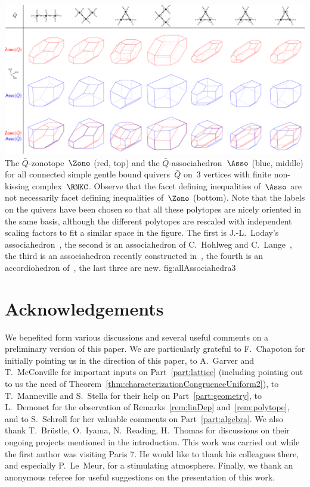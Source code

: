 \documentclass{amsart}
\theoremstyle{definition}
\begin{document}
\captionsetup{width=1.5\textwidth}
{\includegraphics[scale=.27]{allAssociahedra3}}
{The $\bar Q$-zonotope~$\Zono$ (red, top) and the $\bar Q$-associahedron~$\Asso$ (blue, middle) for all connected simple gentle bound quivers~$\bar Q$ on~$3$ vertices with finite non-kissing complex~$\RNKC$. Observe that the facet defining inequalities of~$\Asso$ are not necessarily facet defining inequalities of~$\Zono$ (bottom). Note that the labels on the quivers have been chosen so that all these polytopes are nicely oriented in the same basis, although the different polytopes are rescaled with independent scaling factors to fit a similar space in the figure. The first is J.-L.~Loday's associahedron~\cite{Loday}, the second is an associahedron of C.~Hohlweg and C.~Lange~\cite{HohlwegLange}, the third is an associahedron recently constructed in~\cite{HohlwegPilaudStella}, the fourth is an accordiohedron of~\cite{MannevillePilaud-accordion}, the last three are new.}
{fig:allAssociahedra3}
\captionsetup{width=\textwidth}




\section*{Acknowledgements}

We benefited form various discussions and several useful comments on a preliminary version of this paper.
We are particularly grateful to F.~Chapoton for initially pointing us in the direction of this paper, to A.~Garver and T.~McConville for important inputs on Part~\ref{part:lattice} (including pointing out to us the need of Theorem~\ref{thm:characterizationCongruenceUniform2}), to T.~Manneville and S.~Stella for their help on Part~\ref{part:geometry}, to L.~Demonet for the observation of Remarks~\ref{rem:linDep} and~\ref{rem:polytope}, and to S.~Schroll for her valuable comments on Part~\ref{part:algebra}.
We also thank T.~Br\"ustle, O.~Iyama, N.~Reading, H.~Thomas for discussions on their ongoing projects mentioned in the introduction.
This work was carried out while the first author was visiting Paris 7. He would like to thank his colleagues there, and especially \mbox{P.~Le Meur}, for a stimulating atmosphere.
Finally, we thank an anonymous referee for useful suggestions on the presentation of this work.




\label{sec:biblio}
\end{document}
